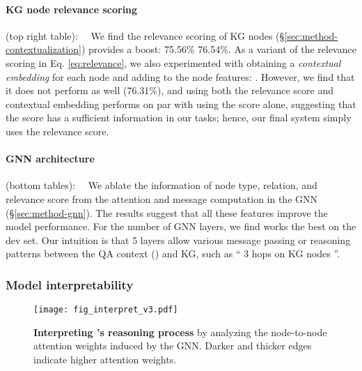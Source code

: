 \paragraph{KG node relevance scoring}\!\!\!\!(top right table):~~
We find the relevance scoring of KG nodes (\S \ref{sec:method-contextualization}) provides a boost: 75.56\%  76.54\%.
As a variant of the relevance scoring in Eq.\! \ref{eq:relevance}, we also experimented with obtaining a \emph{contextual embedding}  for each node  and adding to the node features:
.
However, we find that it does not perform as well (76.31\%), and
using both the relevance score and contextual embedding performs on par with using the score alone, suggesting that the score has a sufficient information in our tasks; hence, our final system simply uses the relevance score.



\paragraph{GNN architecture}\!\!\!\!(bottom tables):~~ We ablate the information of node type, relation, and relevance score from the attention and message computation in the GNN (\S \ref{sec:method-gnn}). The results suggest that all these features improve the model performance. 
For the number of GNN layers, we find  works the best on the dev set. Our intuition is that 5 layers allow various message passing or reasoning patterns between the QA context () and KG, such as ``  3 hops on KG nodes  ''.


\subsubsection{Model interpretability}
\begin{figure}[!t]
\hspace{-1mm}
    \centering \texttt{[image: fig\_interpret\_v3.pdf]}
\caption{\textbf{Interpreting \methodname's reasoning process} by analyzing the node-to-node attention weights induced by the GNN. Darker and thicker edges indicate higher attention weights.
    }
\label{fig:interpret}
\end{figure}

